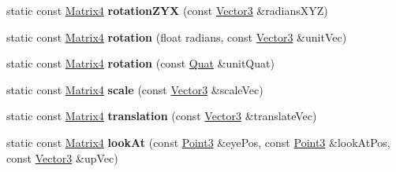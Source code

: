 \begin{DoxyCompactItemize}
\item 
\hypertarget{classVectormath_1_1Aos_1_1Matrix4_a04bf797b98d756df731b8183d6ad0973}{static const \hyperlink{classVectormath_1_1Aos_1_1Matrix4}{Matrix4} {\bfseries rotation\-Z\-Y\-X} (const \hyperlink{classVectormath_1_1Aos_1_1Vector3}{Vector3} \&radians\-X\-Y\-Z)}\label{classVectormath_1_1Aos_1_1Matrix4_a04bf797b98d756df731b8183d6ad0973}

\item 
\hypertarget{classVectormath_1_1Aos_1_1Matrix4_a48b75a3a150980b165f6ef4b85b58054}{static const \hyperlink{classVectormath_1_1Aos_1_1Matrix4}{Matrix4} {\bfseries rotation} (float radians, const \hyperlink{classVectormath_1_1Aos_1_1Vector3}{Vector3} \&unit\-Vec)}\label{classVectormath_1_1Aos_1_1Matrix4_a48b75a3a150980b165f6ef4b85b58054}

\item 
\hypertarget{classVectormath_1_1Aos_1_1Matrix4_a5e0cf98b21567aee0ef03490492c4ae5}{static const \hyperlink{classVectormath_1_1Aos_1_1Matrix4}{Matrix4} {\bfseries rotation} (const \hyperlink{classVectormath_1_1Aos_1_1Quat}{Quat} \&unit\-Quat)}\label{classVectormath_1_1Aos_1_1Matrix4_a5e0cf98b21567aee0ef03490492c4ae5}

\item 
\hypertarget{classVectormath_1_1Aos_1_1Matrix4_a579742127b61fd217970c38579613fa3}{static const \hyperlink{classVectormath_1_1Aos_1_1Matrix4}{Matrix4} {\bfseries scale} (const \hyperlink{classVectormath_1_1Aos_1_1Vector3}{Vector3} \&scale\-Vec)}\label{classVectormath_1_1Aos_1_1Matrix4_a579742127b61fd217970c38579613fa3}

\item 
\hypertarget{classVectormath_1_1Aos_1_1Matrix4_ad47d662f4d28e09535b629523102cf78}{static const \hyperlink{classVectormath_1_1Aos_1_1Matrix4}{Matrix4} {\bfseries translation} (const \hyperlink{classVectormath_1_1Aos_1_1Vector3}{Vector3} \&translate\-Vec)}\label{classVectormath_1_1Aos_1_1Matrix4_ad47d662f4d28e09535b629523102cf78}

\item 
\hypertarget{classVectormath_1_1Aos_1_1Matrix4_aff0393bb7d2eda3ea51c8ee8003d4b84}{static const \hyperlink{classVectormath_1_1Aos_1_1Matrix4}{Matrix4} {\bfseries look\-At} (const \hyperlink{classVectormath_1_1Aos_1_1Point3}{Point3} \&eye\-Pos, const \hyperlink{classVectormath_1_1Aos_1_1Point3}{Point3} \&look\-At\-Pos, const \hyperlink{classVectormath_1_1Aos_1_1Vector3}{Vector3} \&up\-Vec)}\label{classVectormath_1_1Aos_1_1Matrix4_aff0393bb7d2eda3ea51c8ee8003d4b84}


\end{DoxyCompactItemize}
